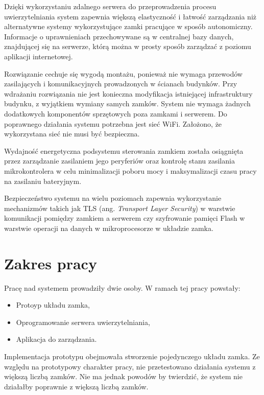 	Dzięki wykorzystaniu zdalnego serwera do przeprowadzenia procesu uwierzytelniania system zapewnia większą elastyczność i łatwość zarządzania niż alternatywne systemy wykorzystujące zamki pracujące w sposób autonomiczny. Informacje o uprawnieniach przechowywane są w centralnej bazy danych, znajdującej się na serwerze, którą można w prosty sposób zarządzać z poziomu aplikacji internetowej.

	Rozwiązanie cechuje się wygodą montażu, ponieważ nie wymaga przewodów zasilających i komunikacyjnych prowadzonych w ścianach budynków. Przy wdrażaniu rozwiązania nie jest konieczna modyfikacja istniejącej infrastruktury budynku, z wyjątkiem wymiany samych zamków. System nie wymaga żadnych dodatkowych komponentów sprzętowych poza zamkami i serwerem. Do poprawnego działania systemu potrzebna jest sieć WiFi. Założono, że wykorzystana sieć nie musi być bezpieczna.

	Wydajność energetyczna podsystemu sterowania zamkiem została osiągnięta przez zarządzanie zasilaniem jego peryferiów oraz kontrolę stanu zasilania mikrokontrolera w celu minimalizacji poboru mocy i maksymalizacji czasu pracy na zasilaniu bateryjnym.

	Bezpieczeństwo systemu na wielu poziomach zapewnia wykorzystanie mechanizmów takich jak TLS (ang. \textit{Transport Layer Security}) w warstwie komunikacji pomiędzy zamkiem a serwerem czy szyfrowanie pamięci Flash w warstwie operacji na danych w mikroprocesorze w układzie zamka.

	\section{Zakres pracy}
		Pracę nad systemem prowadziły dwie osoby. W ramach tej pracy powstały:
		\begin{itemize}
		    \item Protoyp układu zamka,
		    \item Oprogramowanie serwera uwierzytelniania,
		    \item Aplikacja do zarządzania.
		\end{itemize}

		Implementacja prototypu obejmowała stworzenie pojedynczego układu zamka. Ze względu na prototypowy charakter pracy, nie przetestowano działania systemu z większą liczbą zamków. Nie ma jednak powodów by twierdzić, że system nie działałby poprawnie z większą liczbą zamków.


